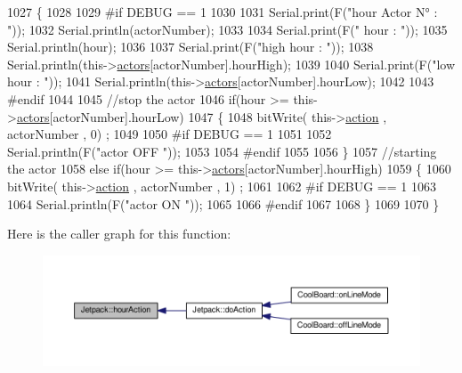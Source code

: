 \begin{DoxyCode}
1027 \{
1028 
1029 \textcolor{preprocessor}{#if DEBUG == 1}
1030     
1031     Serial.print(F(\textcolor{stringliteral}{"hour Actor N° : "}));
1032     Serial.println(actorNumber);
1033 
1034     Serial.print(F(\textcolor{stringliteral}{" hour : "}));
1035     Serial.println(hour);
1036 
1037     Serial.print(F(\textcolor{stringliteral}{"high hour : "}));
1038     Serial.println(this->\hyperlink{class_jetpack_a7e16d2f97837f9712a2e6de1c50d99db}{actors}[actorNumber].hourHigh);
1039 
1040     Serial.print(F(\textcolor{stringliteral}{"low hour : "}));
1041     Serial.println(this->\hyperlink{class_jetpack_a7e16d2f97837f9712a2e6de1c50d99db}{actors}[actorNumber].hourLow);
1042 
1043 \textcolor{preprocessor}{#endif}
1044 
1045     \textcolor{comment}{//stop the actor    }
1046     \textcolor{keywordflow}{if}(hour >= this->\hyperlink{class_jetpack_a7e16d2f97837f9712a2e6de1c50d99db}{actors}[actorNumber].hourLow)
1047     \{
1048         bitWrite( this->\hyperlink{class_jetpack_aca3142925a7b0834b34ae91d26af7765}{action} , actorNumber , 0) ;
1049 
1050 \textcolor{preprocessor}{    #if DEBUG == 1 }
1051 
1052         Serial.println(F(\textcolor{stringliteral}{"actor OFF "}));
1053 
1054 \textcolor{preprocessor}{    #endif  }
1055 
1056     \}
1057     \textcolor{comment}{//starting the actor}
1058     \textcolor{keywordflow}{else} \textcolor{keywordflow}{if}(hour >= this->\hyperlink{class_jetpack_a7e16d2f97837f9712a2e6de1c50d99db}{actors}[actorNumber].hourHigh)
1059     \{
1060         bitWrite( this->\hyperlink{class_jetpack_aca3142925a7b0834b34ae91d26af7765}{action} , actorNumber , 1) ;
1061 
1062 \textcolor{preprocessor}{    #if DEBUG == 1 }
1063 
1064         Serial.println(F(\textcolor{stringliteral}{"actor ON "}));
1065 
1066 \textcolor{preprocessor}{    #endif  }
1067     
1068     \}
1069 
1070 \}
\end{DoxyCode}
Here is the caller graph for this function\+:\nopagebreak
\begin{figure}[H]
\begin{center}
\leavevmode
\includegraphics[width=350pt]{df/d1d/class_jetpack_acd6889af2fe5b057c6bd51b6dac827ef_icgraph}
\end{center}
\end{figure}
\mbox{\label{class_jetpack_ae01c13c785ebdf1b0bb5500234aba1bd}} 
